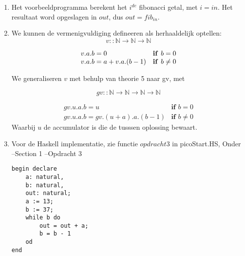\documentclass[12pt]{article}
\newcommand{\N}{\mathbb{N}}
\begin{document}
    \begin{enumerate}
        \item Het voorbeeldprogramma berekent het $i^{de}$ fibonacci getal, met $i = in$.
        Het resultaat word opgeslagen in $out$, dus $out = fib_{in}$.
        
        \item We kunnen de vermenigvuldiging defineeren als herhaaldelijk optellen:
            \begin{equation}
                v :: \N \rightarrow \N \rightarrow \N 
            \end{equation}
                        
        \begin{displaymath} 
        \begin{array}{ll}
            v.a.b = 0                 & \textrm{\textbf{if }} b = 0\\ 
            v.a.b = a + v.a.(b-1)     & \textrm{\textbf{if }} b \neq 0\\ 
        \end{array} 
        \end{displaymath}
                
        We generaliseren $v$ met behulp van theorie 5 naar gv, met 
        
        \begin{equation}
            gv :: \N \rightarrow \N \rightarrow \N \rightarrow \N        
        \end{equation}
        
        \begin{displaymath}
        \begin{array}{ll}
            gv.u.a.b = u & \textbf{if } b = 0\\
            gv.u.a.b = gv.(u+a).a.(b-1) & \textbf{if } b \neq 0
        \end{array}
        \end{displaymath}
        Waarbij $u$ de accumulator is die de tusssen oplossing bewaart.

        
    \item Voor de Haskell implementatie, zie functie $opdracht3$ in picoStart.HS, Onder --Section 1 --Opdracht 3
            \begin{verbatim}
begin declare
    a: natural,
    b: natural,
    out: natural;
    a := 13;
    b := 37;
    while b do
        out = out + a;
        b = b - 1
    od    
end
        \end{verbatim}
      

\end{enumerate}
\end{document}
